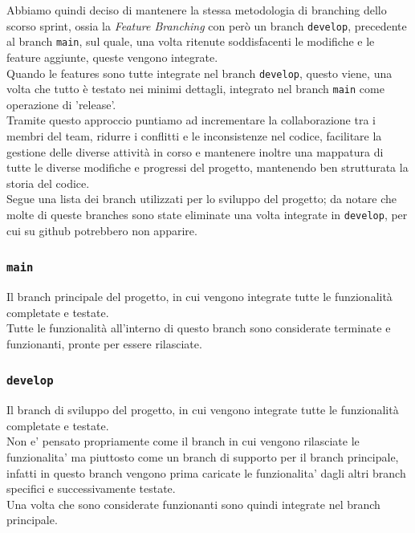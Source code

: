 \documentclass{article}
\begin{document}
\noindent
Abbiamo quindi deciso di mantenere la stessa metodologia di branching dello scorso sprint, ossia la \textit{Feature Branching} con però un branch \texttt{develop}, precedente al branch \texttt{main}, sul quale, una volta ritenute soddisfacenti le modifiche e le feature aggiunte, queste vengono integrate.\\
Quando le features sono tutte integrate nel branch \texttt{develop}, questo viene, una volta che tutto è testato nei minimi dettagli, integrato nel branch \texttt{main} come operazione di 'release'.\\

\noindent
Tramite questo approccio puntiamo ad incrementare la collaborazione tra i membri del team, ridurre i conflitti e le inconsistenze nel codice, facilitare la gestione delle diverse attività in corso e mantenere inoltre una mappatura di tutte le diverse modifiche e progressi del progetto, mantenendo ben strutturata la storia del codice.\\

Segue una lista dei branch utilizzati per lo sviluppo del progetto; da notare che molte di queste branches sono state eliminate una volta integrate in \texttt{develop}, per cui su github potrebbero non apparire.

\subsubsection{\texttt{main}}

Il branch principale del progetto, in cui vengono integrate tutte le funzionalità completate e testate.\\
Tutte le funzionalità all'interno di questo branch sono considerate terminate e funzionanti, pronte per essere rilasciate.

\subsubsection{\texttt{develop}}

Il branch di sviluppo del progetto, in cui vengono integrate tutte le funzionalità completate e testate.\\
Non e' pensato propriamente come il branch in cui vengono rilasciate le funzionalita' ma piuttosto come un branch di supporto per il branch principale, infatti in questo branch vengono prima caricate le funzionalita' dagli altri branch specifici e successivamente testate.\\
Una volta che sono considerate funzionanti sono quindi integrate nel branch principale.
\end{document}
